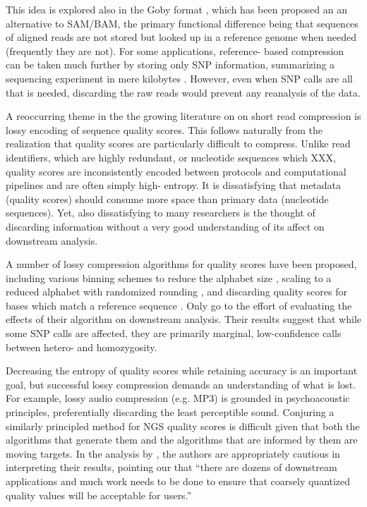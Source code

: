 \documentclass[twocolumn]{article}
\begin{document}
This idea is explored also in the Goby format \citep{Goby2012}, which has been
proposed an an alternative to SAM/BAM, the primary functional difference being
that sequences of aligned reads are not stored but looked up in a reference
genome when needed (frequently they are not). For some applications, reference-
based compression can be taken much further by storing only SNP information,
summarizing a sequencing experiment in mere kilobytes \citep{Christley2009}.
However, even when SNP calls are all that is needed, discarding the raw reads
would prevent any reanalysis of the data.



A reoccurring theme in the  the growing literature on on short read
compression is lossy encoding of sequence quality scores. This follows
naturally from the realization that quality scores are particularly difficult
to compress. Unlike read identifiers, which are highly redundant, or
nucleotide sequences which XXX, quality scores are inconsistently encoded
between protocols and computational pipelines and are often simply high-
entropy. It is dissatisfying that metadata (quality scores) should consume
more space than primary data (nucleotide sequences). Yet, also dissatisfying
to many researchers is the thought of discarding information without a very
good understanding of its affect on downstream analysis.

A number of lossy compression algorithms for quality scores have been
proposed, including various binning schemes to reduce the alphabet size
\citep{Wan2011}, scaling to a reduced alphabet with randomized rounding
\citep{Kozanitis2011}, and discarding quality scores for bases which match a
reference sequence \citep{Hsi-YangFritz2011}. Only \citet{Kozanitis2011} go to
the effort of evaluating the effects of their algorithm on downstream
analysis. Their results suggest that while some SNP calls are affected, they
are primarily marginal, low-confidence calls between hetero- and homozygosity.

Decreasing the entropy of quality scores while retaining accuracy is an
important goal, but successful lossy compression demands an understanding of
what is lost. For example, lossy audio compression (e.g. MP3) is grounded in
psychoacoustic principles, preferentially discarding the least perceptible
sound. Conjuring a similarly principled method for NGS quality scores is
difficult given that both the algorithms that generate them and the algorithms
that are informed by them are moving targets. In the analysis by
\citet{Kozanitis2011}, the authors are appropriately cautious in interpreting
their results, pointing our that ``there are dozens of downstream applications
and much work needs to be done to ensure that coarsely quantized quality
values will be acceptable for users.''
\end{document}
